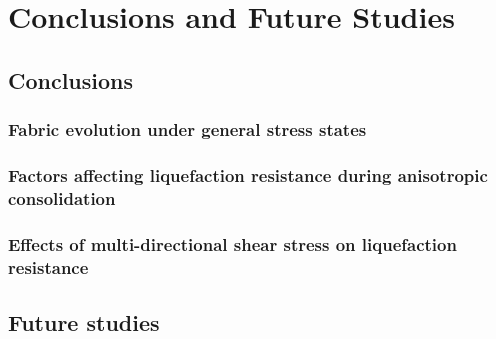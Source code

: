 \documentclass[../main]{subfiles}
\begin{document}
\chapter{Conclusions and Future Studies}
\label{ch:conclusions}

\section{Conclusions}
\label{sec:conclusions}

\subsection{Fabric evolution under general stress states}
\label{subsec:concl_ch3}


\subsection{Factors affecting liquefaction resistance during anisotropic consolidation}
\label{subsec:concl_ch4}


\subsection{Effects of multi-directional shear stress on liquefaction resistance}
\label{subsec:concl_ch5}


\section{Future studies}
\label{sec:future}

\end{document}
